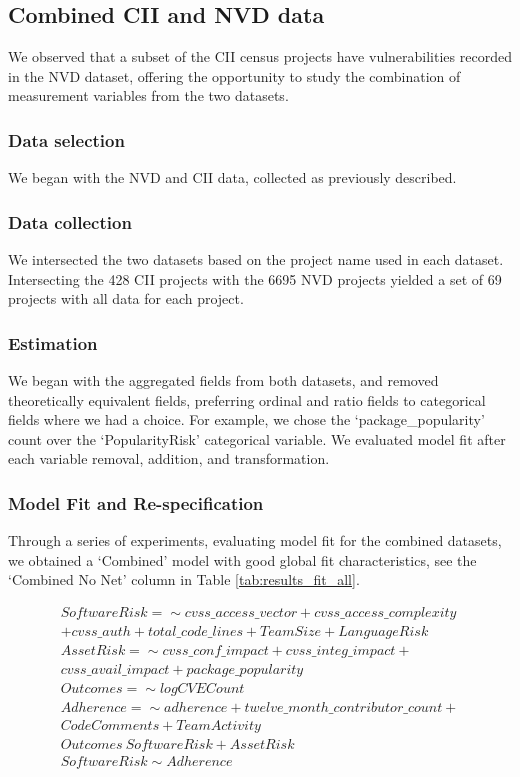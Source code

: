 
\subsection{Combined CII and NVD data}
We observed that a subset of the CII census projects have vulnerabilities recorded in the NVD dataset, offering the opportunity to study the combination of measurement variables from the two datasets. 

\subsubsection{Data selection}
We began with the NVD and CII data, collected as previously described. 

\subsubsection{Data collection}
We intersected the two datasets based on the project name used in each dataset. Intersecting the 428 CII projects with the 6695 NVD projects yielded a set of 69 projects with all data for each project. 

\subsubsection{Estimation}
We began with the aggregated fields from both datasets, and removed theoretically equivalent fields, preferring ordinal and ratio fields to categorical fields where we had a choice. For example, we chose the `package\_popularity' count over the `PopularityRisk' categorical variable. We evaluated model fit after each variable removal, addition, and transformation.

\subsubsection{Model Fit and Re-specification}
Through a series of experiments, evaluating model fit for the combined datasets, we obtained a `Combined' model with good global fit characteristics, see the `Combined No Net' column in Table \ref{tab:results_fit_all}.

\begin{align*}
	SoftwareRisk =\sim cvss\_access\_vector + cvss\_access\_complexity\\
	 + cvss\_auth + total\_code\_lines + TeamSize + LanguageRisk\\
	AssetRisk =\sim cvss\_conf\_impact + cvss\_integ\_impact +\\ cvss\_avail\_impact + package\_popularity\\
	Outcomes =\sim  logCVECount \\
	Adherence =\sim adherence + twelve\_month\_contributor\_count +\\ CodeComments + TeamActivity \\
	Outcomes ~ SoftwareRisk + AssetRisk\\
	SoftwareRisk \sim  Adherence\\
\end{align*}

